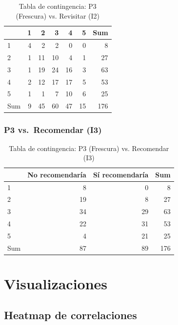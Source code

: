 \documentclass[
  spanish,
]{article}
\begin{document}
\begin{table}[!h]
\centering
\caption{\label{tab:cont-p3-revis}Tabla de contingencia: P3 (Frescura) vs. Revisitar (I2)}
\centering
\begin{tabular}[t]{lrrrrrr}
\toprule
  & 1 & 2 & 3 & 4 & 5 & Sum\\
\midrule
1 & 4 & 2 & 2 & 0 & 0 & 8\\
2 & 1 & 11 & 10 & 4 & 1 & 27\\
3 & 1 & 19 & 24 & 16 & 3 & 63\\
4 & 2 & 12 & 17 & 17 & 5 & 53\\
5 & 1 & 1 & 7 & 10 & 6 & 25\\
\addlinespace
Sum & 9 & 45 & 60 & 47 & 15 & 176\\
\bottomrule
\end{tabular}
\end{table}

\subsubsection{P3 vs.~Recomendar (I3)}\label{p3-vs.-recomendar-i3}

\begin{table}[!h]
\centering
\caption{\label{tab:cont-p3-recom}Tabla de contingencia: P3 (Frescura) vs. Recomendar (I3)}
\centering
\begin{tabular}[t]{lrrr}
\toprule
  & No recomendaría & Sí recomendaría & Sum\\
\midrule
1 & 8 & 0 & 8\\
2 & 19 & 8 & 27\\
3 & 34 & 29 & 63\\
4 & 22 & 31 & 53\\
5 & 4 & 21 & 25\\
\addlinespace
Sum & 87 & 89 & 176\\
\bottomrule
\end{tabular}
\end{table}

\newpage

\section{Visualizaciones}\label{visualizaciones}

\subsection{Heatmap de correlaciones}\label{heatmap-de-correlaciones}
\end{document}

